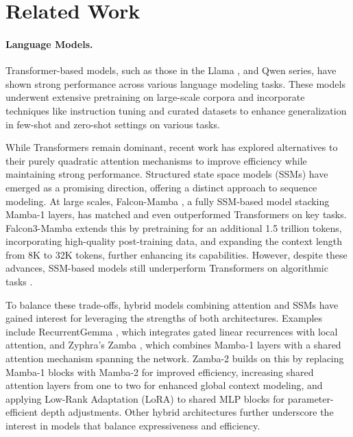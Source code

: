\section{Related Work}
\paragraph{Language Models.}
Transformer-based models, such as those in the Llama \citep{llama}, and Qwen \citep{qwen2} series, have shown strong performance across various language modeling tasks. These models underwent extensive pretraining on large-scale corpora and incorporate techniques like instruction tuning and curated datasets to enhance generalization in few-shot and zero-shot settings on various tasks.

While Transformers remain dominant, recent work has explored alternatives to their purely quadratic attention mechanisms to improve efficiency while maintaining strong performance. Structured state space models (SSMs) \citep{mamba1, mamba2} have emerged as a promising direction, offering a distinct approach to sequence modeling.
At large scales, Falcon-Mamba \citep{falcon}, a fully SSM-based model stacking Mamba-1 layers, has matched and even outperformed Transformers on key tasks. Falcon3-Mamba extends this by pretraining for an additional 1.5 trillion tokens, incorporating high-quality post-training data, and expanding the context length from 8K to 32K tokens, further enhancing its capabilities.
However, despite these advances, SSM-based models still underperform Transformers on algorithmic tasks \citep{repeat_after_me,wen2024rnnstransformersyetkey,waleffe2024}.

To balance these trade-offs, hybrid models combining attention and SSMs have gained interest for leveraging the strengths of both architectures.
Examples include RecurrentGemma \citep{recurrentgemma}, which integrates gated linear recurrences with local attention, and Zyphra’s Zamba \citep{zamba}, which combines Mamba-1 layers with a shared attention mechanism spanning the network.
Zamba-2 \citep{zamba2} builds on this by replacing Mamba-1 blocks with Mamba-2 for improved efficiency, increasing shared attention layers from one to two for enhanced global context modeling, and applying Low-Rank Adaptation (LoRA) \citep{lora} to shared MLP blocks for parameter-efficient depth adjustments.
Other hybrid architectures \citep{jamba2024, waleffe2024} further underscore the interest in models that balance expressiveness and efficiency.

